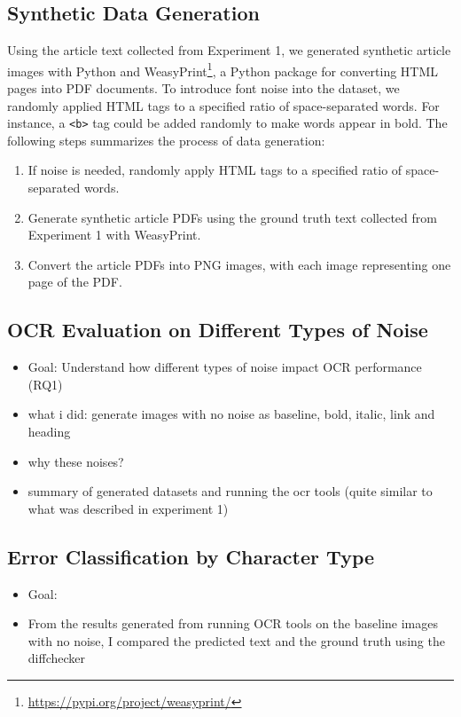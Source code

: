 \documentclass[12pt,oneside]{memoir}
\begin{document}
\subsection{Synthetic Data Generation}

Using the article text collected from Experiment 1, we generated synthetic article images with Python and WeasyPrint\footnote{\url{https://pypi.org/project/weasyprint/}}, a Python package for converting HTML pages into PDF documents.
To introduce font noise into the dataset, we randomly applied HTML tags to a specified ratio of space-separated words.
For instance, a \texttt{<b>} tag could be added randomly to make words appear in bold.
The following steps summarizes the process of data generation:

\begin{enumerate}
    \item If noise is needed, randomly apply HTML tags to a specified ratio of space-separated words.
    \item Generate synthetic article PDFs using the ground truth text collected from Experiment 1 with WeasyPrint.
    \item Convert the article PDFs into PNG images, with each image representing one page of the PDF.
\end{enumerate}

\subsection{OCR Evaluation on Different Types of Noise}

\begin{itemize}
    \item Goal: Understand how different types of noise impact OCR performance (RQ1)
    \item what i did: generate images with no noise as baseline, bold, italic, link and heading
    \item why these noises?
    \item summary of generated datasets and running the ocr tools (quite similar to what was described in experiment 1)
\end{itemize}

\subsection{Error Classification by Character Type}

\begin{itemize}
    \item Goal: 
    \item From the results generated from running OCR tools on the baseline images with no noise, I compared the predicted text and the ground truth using the diffchecker
\end{itemize}
\end{document}
